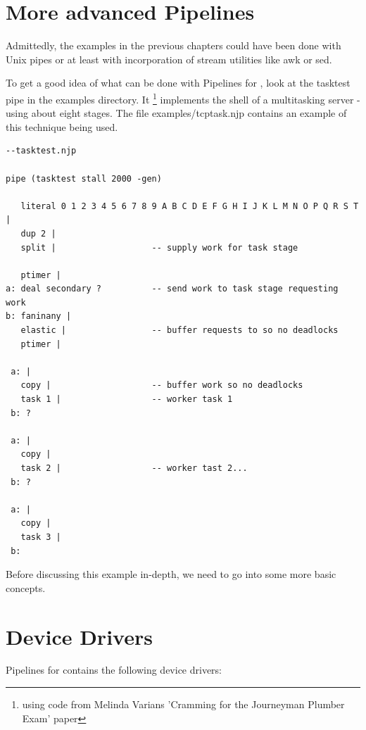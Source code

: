 \chapter{More advanced Pipelines}
Admittedly, the examples in the previous chapters could have been done
with Unix pipes or at least with incorporation of stream utilities
like awk or sed.


To get a good idea of what can be done with Pipelines for \nr{}, look at the tasktest
pipe in the examples directory.  It \footnote{using code from Melinda Varians
'Cramming for the Journeyman Plumber Exam' paper} implements the
shell of a  multitasking server - using about eight stages.  The file
examples/tcptask.njp contains an example of this technique being used.
\begin{lstlisting}
--tasktest.njp

pipe (tasktest stall 2000 -gen)

   literal 0 1 2 3 4 5 6 7 8 9 A B C D E F G H I J K L M N O P Q R S T |
   dup 2 |
   split |                   -- supply work for task stage

   ptimer |
a: deal secondary ?          -- send work to task stage requesting work
b: faninany |
   elastic |                 -- buffer requests to so no deadlocks
   ptimer |

 a: |
   copy |                    -- buffer work so no deadlocks
   task 1 |                  -- worker task 1
 b: ?

 a: |
   copy |
   task 2 |                  -- worker tast 2...
 b: ?

 a: |
   copy |
   task 3 |
 b:
\end{lstlisting}

Before discussing this example in-depth, we need to go into some more
basic concepts.

\chapter{Device Drivers}
Pipelines for \nr{} contains the following device drivers:

